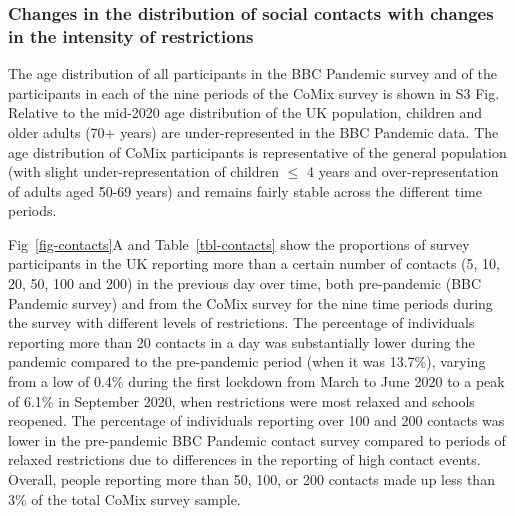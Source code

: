 \documentclass[
  10pt,
  letterpaper,
]{article}
\begin{document}
\subsubsection{Changes in the distribution of social contacts with
changes in the intensity of
restrictions}\label{changes-in-the-distribution-of-social-contacts-with-changes-in-the-intensity-of-restrictions}

The age distribution of all participants in the BBC Pandemic survey and
of the participants in each of the nine periods of the CoMix survey is
shown in S3 Fig. Relative to the mid-2020 age distribution of the UK
population, children and older adults (70+ years) are under-represented
in the BBC Pandemic data. The age distribution of CoMix participants is
representative of the general population (with slight
under-representation of children \(\le\) 4 years and over-representation
of adults aged 50-69 years) and remains fairly stable across the
different time periods.

Fig~\ref{fig-contacts}A and Table~\ref{tbl-contacts} show the
proportions of survey participants in the UK reporting more than a
certain number of contacts (5, 10, 20, 50, 100 and 200) in the previous
day over time, both pre-pandemic (BBC Pandemic survey) and from the
CoMix survey for the nine time periods during the survey with different
levels of restrictions. The percentage of individuals reporting more
than 20 contacts in a day was substantially lower during the pandemic
compared to the pre-pandemic period (when it was 13.7\%), varying from a
low of 0.4\% during the first lockdown from March to June 2020 to a peak
of 6.1\% in September 2020, when restrictions were most relaxed and
schools reopened. The percentage of individuals reporting over 100 and
200 contacts was lower in the pre-pandemic BBC Pandemic contact survey
compared to periods of relaxed restrictions due to differences in the
reporting of high contact events. Overall, people reporting more than
50, 100, or 200 contacts made up less than 3\% of the total CoMix survey
sample.
\end{document}
